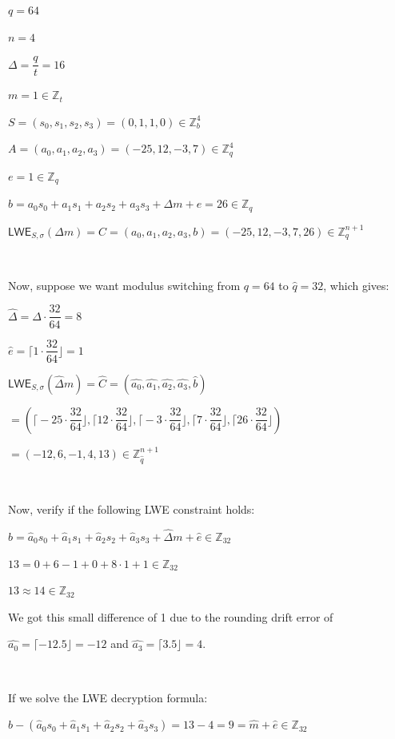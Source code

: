 $q = 64$

$n = 4$

$\Delta = \dfrac{q}{t} = 16$

$m = 1 \in \mathbb{Z}_t$

$S = (s_0, s_1, s_2, s_3) = (0, 1, 1, 0) \in \mathbb{Z}_b^4$

$A = (a_0, a_1, a_2, a_3) = (-25, 12, -3, 7) \in \mathbb{Z}_q^4$

$e = 1 \in \mathbb{Z}_q$

$b = a_0s_0 + a_1s_1 + a_2s_2 + a_3s_3 + \Delta m + e = 26 \in \mathbb{Z}_q$

$\textsf{LWE}_{S, \sigma}(\Delta m) = C = (a_0, a_1, a_2, a_3, b) = (-25, 12, -3, 7, 26) \in \mathbb{Z}_q^{n+1}$

$ $

Now, suppose we want modulus switching from $q=64$ to $\hat{q} = 32$, which gives:

$\hat{\Delta} = \Delta\cdot\dfrac{32}{64} = 8$

$\hat{e} = \Big\lceil 1 \cdot \dfrac{32}{64} \Big\rfloor = 1$

$\textsf{LWE}_{S, \sigma}(\hat{\Delta} m) = \hat{C} = (\hat{a_0}, \hat{a_1}, \hat{a_2}, \hat{a_3}, \hat{b})$

$ = \left(\Big\lceil -25\cdot\dfrac{32}{64}\Big\rfloor, \Big\lceil12\cdot\dfrac{32}{64}\Big\rfloor, \Big\lceil-3\cdot\dfrac{32}{64}\Big\rfloor, \Big\lceil7\cdot\dfrac{32}{64}\Big\rfloor, \Big\lceil26\cdot\dfrac{32}{64}\Big\rfloor\right)$

$ = (-12, 6, -1, 4, 13) \in \mathbb{Z}_{\hat{q}}^{n+1}$

$ $

Now, verify if the following LWE constraint holds:

$\hat{b} = \hat{a}_0s_0 + \hat{a}_1s_1 + \hat{a}_2s_2 + \hat{a}_3s_3 + \hat{\Delta}m + \hat{e} \in \mathbb{Z}_{32}$

$13 = 0 + 6 - 1 + 0 + 8 \cdot 1 + 1 \in \mathbb{Z}_{32}$

$13 \approx 14 \in \mathbb{Z}_{32}$

We got this small difference of 1 due to the rounding drift error of 

$\hat {a_0} = \lceil -12.5 \rfloor = -12$ and $\hat{a_3} =  \lceil 3.5 \rfloor = 4$.

$ $

If we solve the LWE decryption formula:

$\hat b - (\hat{a}_0s_0 + \hat{a}_1s_1 + \hat{a}_2s_2 + \hat{a}_3s_3) = 13 - 4 = 9 = \hat m + \hat e \in \mathbb{Z}_{32}$


